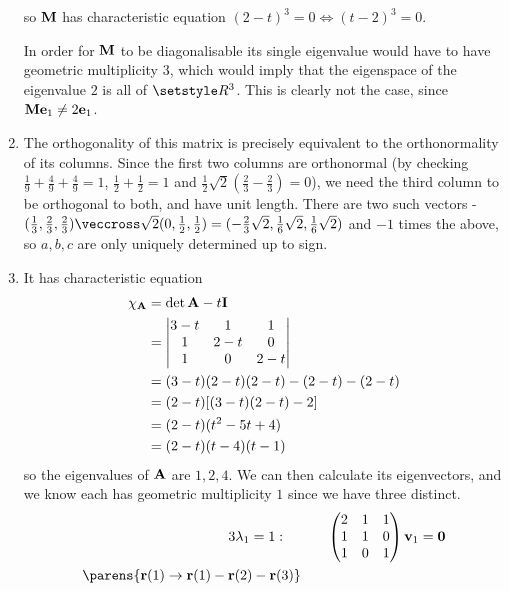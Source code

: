 \documentclass[fleqn,a4paper,11pt]{article}
\begin{document}
\begin{enumerate}[label=\textbf{\arabic*.}]
   so \(\mathbf{M}\) has characteristic equation
   \((2 - t)^3 = 0 \iff (t - 2)^3 = 0\).

   In order for \(\mathbf{M}\) to be diagonalisable its single eigenvalue would have
   to have geometric multiplicity \(3\), which would imply that the eigenspace
   of the eigenvalue \(2\) is all of \(\Reals^3\). This is clearly not the
   case, since \(\mathbf{M} \mathrm{\mathbf{e}}_1 \ne 2\mathrm{\mathbf{e}}_1\).
  \item
   The orthogonality of this matrix is precisely equivalent to the
   orthonormality of its columns. Since the first two columns are orthonormal
   (by checking \(\frac 19 + \frac 49 + \frac 49 = 1\),
   \(\frac 12 + \frac 12 = 1\) and
   \(\frac 12 \sqrt 2(\frac 23 - \frac 23) = 0\)), we need the third column to
   be orthogonal to both, and have unit length. There are two such vectors -
   \((\frac 13, \frac 23, \frac 23) \veccross \sqrt 2(0, \frac 12, \frac 12)
     = (-\frac 23 \sqrt 2, \frac 16 \sqrt 2, \frac 16 \sqrt 2)\)
   and \(-1\) times the above, so \(a, b, c\) are only uniquely determined up to
   sign.
  \item
   It has characteristic equation
   \begin{align*}
    \chi_{\mathbf{A}}
     &= \det{\mathbf{A} - t \mathbf{I}} \\
     &=
     \begin{vmatrix}
      3 - t & 1 & 1 \\
      1 & 2 - t & 0 \\
      1 & 0 & 2 - t
     \end{vmatrix} \\
    &= (3 - t)(2 - t)(2 - t) - (2 - t) - (2 - t) \\
    &= (2 - t)[(3 - t)(2 - t) - 2] \\
    &= (2 - t)(t^2 - 5t + 4) \\
    &= (2 - t)(t - 4)(t - 1)
   \end{align*}
   so the eigenvalues of \(\mathbf{A}\) are \(1, 2, 4\). We can then calculate its
   eigenvectors, and we know each has geometric multiplicity \(1\) since we have
   three distinct.
   \begin{alignat*}3
    \lambda_1 = 1:\quad{}&& &&
    \begin{pmatrix}
     2 & 1 & 1 \\
     1 & 1 & 0 \\
     1 & 0 & 1
    \end{pmatrix}
    \vec v_1 &= \vec 0 \\
    \parens{
     \vec r(1) \to \vec r(1) - \vec r(2) - \vec r(3)
}
\end{alignat*}
\end{enumerate}
\end{document}
